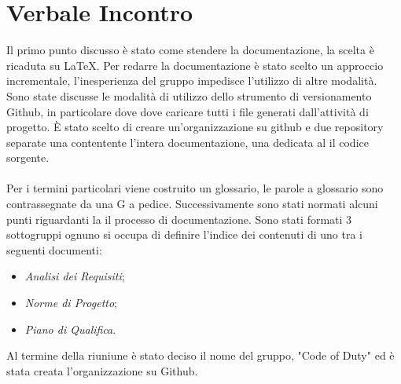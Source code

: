 \section{Verbale Incontro}
	Il primo punto discusso è stato come stendere la documentazione, la scelta è ricaduta su LaTeX. Per redarre la documentazione è stato scelto un approccio incrementale, l'inesperienza del gruppo impedisce l'utilizzo	di altre modalità. Sono state discusse le modalità di utilizzo dello strumento di versionamento Github, in particolare dove dove caricare tutti i file generati dall'attività di progetto. È stato scelto di creare un'organizzazione su github e due repository separate una contentente l'intera documentazione, una dedicata al il codice sorgente.
	\\ \\ 
	\noindent Per i termini particolari viene costruito un glossario, le parole a glossario sono contrassegnate da una G a pedice.
    Successivamente sono stati normati alcuni punti riguardanti la il processo di documentazione. Sono stati formati 3 sottogruppi ognuno si occupa di definire l'indice dei contenuti di uno tra i seguenti documenti: 
    \begin{itemize}
        \item \textit{Analisi dei Requisiti};
        \item \textit{Norme di Progetto};
        \item \textit{Piano di Qualifica}.
    \end{itemize}	
    
    \noindent Al termine della riuniune è stato deciso il nome del gruppo, "Code of Duty" ed è stata creata l'organizzazione su Github.